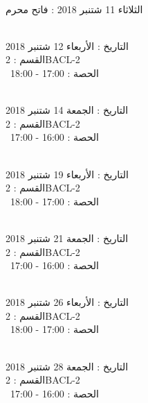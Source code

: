 \par
\noindent\makebox[\linewidth]{\rule{\paperwidth}{0.4pt}}
 \\
الثلاثاء 11 شتنبر 2018 :   فاتح محرم
\par
\noindent\makebox[\linewidth]{\rule{\paperwidth}{0.4pt}}
 \\
التاريخ : الأربعاء 12 شتنبر 2018 \\
القسم : 2BACL-2 \\
 \  
الحصة : 17:00 - 18:00 \\
\par
\noindent\makebox[\linewidth]{\rule{\paperwidth}{0.4pt}}
 \\
التاريخ : الجمعة 14 شتنبر 2018 \\
القسم : 2BACL-2 \\
 \  
الحصة : 16:00 - 17:00 \\
\par
\noindent\makebox[\linewidth]{\rule{\paperwidth}{0.4pt}}
 \\
التاريخ : الأربعاء 19 شتنبر 2018 \\
القسم : 2BACL-2 \\
 \  
الحصة : 17:00 - 18:00 \\
\par
\noindent\makebox[\linewidth]{\rule{\paperwidth}{0.4pt}}
 \\
التاريخ : الجمعة 21 شتنبر 2018 \\
القسم : 2BACL-2 \\
 \  
الحصة : 16:00 - 17:00 \\
\par
\noindent\makebox[\linewidth]{\rule{\paperwidth}{0.4pt}}
 \\
التاريخ : الأربعاء 26 شتنبر 2018 \\
القسم : 2BACL-2 \\
 \  
الحصة : 17:00 - 18:00 \\
\par
\noindent\makebox[\linewidth]{\rule{\paperwidth}{0.4pt}}
 \\
التاريخ : الجمعة 28 شتنبر 2018 \\
القسم : 2BACL-2 \\
 \  
الحصة : 16:00 - 17:00 \\
\par
